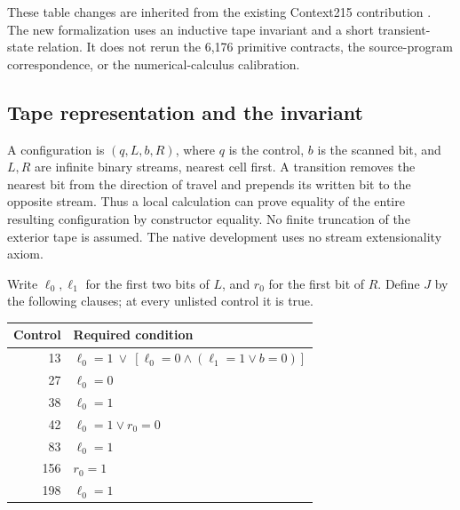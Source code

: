 \documentclass[11pt]{article}
\begin{document}
These table changes are inherited from the existing Context215 contribution \cite{context}. The new formalization uses an inductive tape invariant and a short transient-state relation. It does not rerun the 6,176 primitive contracts, the source-program correspondence, or the numerical-calculus calibration.

\subsection{Tape representation and the invariant}

A configuration is $(q,L,b,R)$, where $q$ is the control, $b$ is the scanned bit, and $L,R$ are infinite binary streams, nearest cell first. A transition removes the nearest bit from the direction of travel and prepends its written bit to the opposite stream. Thus a local calculation can prove equality of the entire resulting configuration by constructor equality. No finite truncation of the exterior tape is assumed. The native development uses no stream extensionality axiom.

Write $\ell_0,\ell_1$ for the first two bits of $L$, and $r_0$ for the first bit of $R$. Define $J$ by the following clauses; at every unlisted control it is true.

\begin{center}
\begin{tabular}{@{}rl@{}}
\toprule
Control & Required condition\\
\midrule
13 & $\ell_0=1\ \lor\ [\ell_0=0\land(\ell_1=1\lor b=0)]$\\
27 & $\ell_0=0$\\
38 & $\ell_0=1$\\
42 & $\ell_0=1\lor r_0=0$\\
83 & $\ell_0=1$\\
156 & $r_0=1$\\
198 & $\ell_0=1$\\
\bottomrule
\end{tabular}
\end{center}
\end{document}
